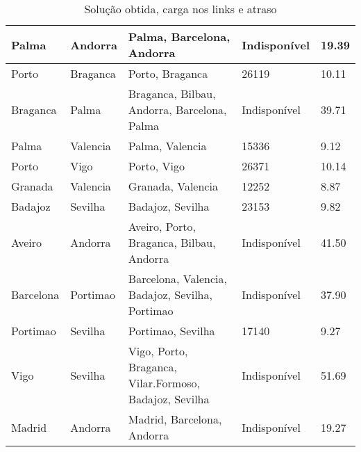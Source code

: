 \begin{table}[!htb]
{\begin{tabular}{|l|l|l|l|l|}
Palma & Andorra & Palma, Barcelona, Andorra & Indisponível & 19.39 \\ \hline
Porto & Braganca & Porto, Braganca & 26119 & 10.11 \\ \hline
Braganca & Palma & Braganca, Bilbau, Andorra, Barcelona, Palma & Indisponível & 39.71 \\ \hline
Palma & Valencia & Palma, Valencia & 15336 & 9.12 \\ \hline
Porto & Vigo & Porto, Vigo & 26371 & 10.14 \\ \hline
Granada & Valencia & Granada, Valencia & 12252 & 8.87 \\ \hline
Badajoz & Sevilha & Badajoz, Sevilha & 23153 & 9.82 \\ \hline
Aveiro & Andorra & Aveiro, Porto, Braganca, Bilbau, Andorra & Indisponível & 41.50 \\ \hline
Barcelona & Portimao & Barcelona, Valencia, Badajoz, Sevilha, Portimao & Indisponível & 37.90 \\ \hline
Portimao & Sevilha & Portimao, Sevilha & 17140 & 9.27 \\ \hline
Vigo & Sevilha & Vigo, Porto, Braganca, Vilar.Formoso, Badajoz, Sevilha & Indisponível & 51.69 \\ \hline
Madrid & Andorra & Madrid, Barcelona, Andorra & Indisponível & 19.27 \\ \hline
\end{tabular}}
\caption[]{Solução obtida, carga nos links e atraso}
\end{table}

